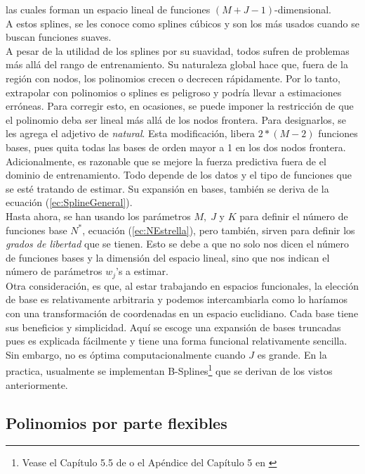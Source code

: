 \documentclass[../Main/Main.tex]{subfiles}
\begin{document}
las cuales forman un espacio lineal de funciones $(M + J - 1)$-dimensional.\\

A estos splines, se les conoce como splines cúbicos y son los más usados cuando se buscan funciones suaves.\\ 

A pesar de la utilidad de los splines por su suavidad, todos sufren de problemas más allá del rango de entrenamiento. Su naturaleza global hace que, fuera de la región con nodos, los polinomios crecen o decrecen rápidamente. Por lo tanto, extrapolar con polinomios o splines es peligroso y podría llevar a estimaciones erróneas. Para corregir esto, en ocasiones, se puede imponer la restricción de que el polinomio deba ser lineal más allá de los nodos frontera. Para designarlos, se les agrega el adjetivo de \textit{natural}. Esta modificación, libera $2*(M-2)$ funciones bases, pues quita todas las bases de orden mayor a 1 en los dos nodos frontera. Adicionalmente, es razonable que se mejore la fuerza predictiva fuera de el dominio de entrenamiento. Todo depende de los datos y el tipo de funciones que se esté tratando de estimar. Su expansión en bases, también se deriva de la ecuación (\ref{ec:SplineGeneral}).\\

Hasta ahora, se han usando los parámetros $M,\;J$ y $K$ para definir el número de funciones base $N^*$, ecuación (\ref{ec:NEstrella}), pero también, sirven para definir los \textit{grados de libertad} que se tienen. Esto se debe a que no solo nos dicen el número de funciones bases y la dimensión del espacio lineal, sino que nos indican el número de parámetros $w_j$'s a estimar. \\

Otra consideración, es que, al estar trabajando en espacios funcionales, la elección de base es relativamente arbitraria y podemos intercambiarla como lo haríamos con una transformación de coordenadas en un espacio euclidiano. Cada base tiene sus beneficios y simplicidad. Aquí se escoge una expansión de bases truncadas pues es explicada fácilmente y tiene una forma funcional relativamente sencilla. Sin embargo, no es óptima computacionalmente cuando $J$ es grande. En la practica, usualmente se implementan B-Splines\footnote{Vease el Capítulo 5.5 de \autocite{wasserman2007all} o el Apéndice del Capítulo 5 en \autocite{hastie2008elements}} que se derivan de los vistos anteriormente.  

\subsection{Polinomios por parte flexibles}
\end{document}
